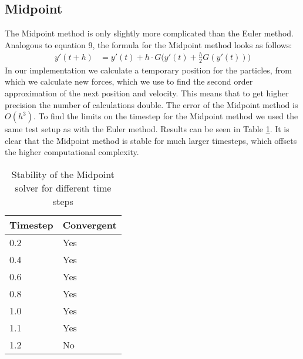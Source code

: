 \documentclass[a4paper,twoside,11pt,twocolumn]{article}
\begin{document}
\subsection{Midpoint}
The Midpoint method is only slightly more complicated than the Euler method. Analogous to equation 9, the formula for the Midpoint method looks as follows:
\begin{align}
	y'(t+h) &= y'(t) + h\cdot G\biggl(y'(t)+\frac{h}{2}G(y'(t))\biggr)
\end{align}
In our implementation we calculate a temporary position for the particles, from which we calculate new forces, which we use to find the second order approximation of the next position and velocity. This means that to get higher precision the number of calculations double. The error of the Midpoint method is $O(h^3)$.
To find the limits on the timestep for the Midpoint method we used the same test setup as with the Euler method. Results can be seen in Table \ref{Midpoint}. It is clear that the Midpoint method is stable for much larger timesteps, which offsets the higher computational complexity.
\begin{table}[h]
	\caption{Stability of the Midpoint solver for different time steps}
	\label{Midpoint}
	\begin{tabular}{|l|l|}
		\hline
		\textbf{Timestep} & \textbf{Convergent} \\ \hline
		0.2               & Yes                 \\ \hline
		0.4               & Yes                 \\ \hline
		0.6               & Yes                 \\ \hline
		0.8               & Yes                 \\ \hline
		1.0               & Yes                 \\ \hline
		1.1               & Yes                 \\ \hline
		1.2               & No                  \\ \hline
	\end{tabular}
\end{table}
\end{document}
